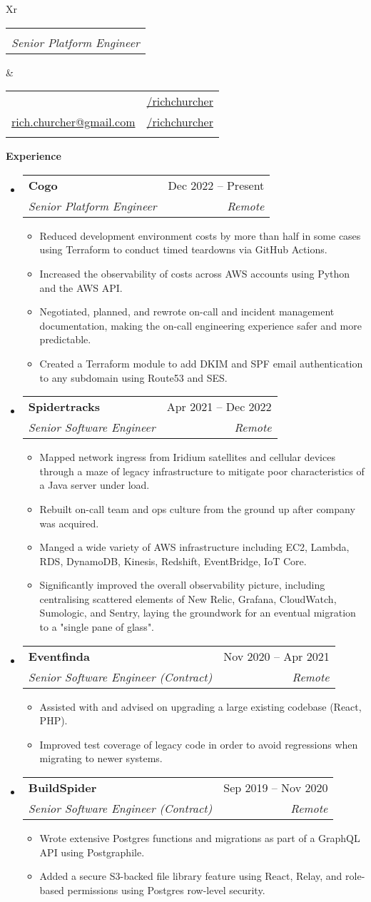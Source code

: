 \documentclass[12pt]{article}
\makeatletter
\def \fullname {Rich Churcher}
\def \subtitle {Senior Platform Engineer}
\def \linkedinicon {\faLinkedin}
\def \linkedinlink {https://linkedin.com/in/dwight-schrute/}
\def \linkedintext {/richchurcher}
\def \phoneicon {\faPhone}
\def \phonetext {+64-21-126-3919}
\def \emailicon {\faEnvelope}
\def \emaillink {mailto:rich.churcher@gmail.com}
\def \emailtext {rich.churcher@gmail.com}
\def \githubicon {\faGithub}
\def \githublink {https://github.com/richchurcher}
\def \githubtext {/richchurcher}
\def \headertype {\doublecol} %
\def \entryspacing {-0em}
\def \linkedin {\linkedinicon \hspace{1em}\href{\linkedinlink}{\linkedintext}}
\def \phone {\phoneicon \hspace{1em}{\phonetext}}
\def \email {\emailicon \hspace{1em}\href{\emaillink}{\emailtext}}
\def \github {\githubicon \hspace{1em}\href{\githublink}{\githubtext}}
\renewcommand{\section}[2]{\vspace{0.5ex}
  \colorbox{secondary}{\color{white}\raggedbottom\normalsize\textbf{{#1}{\hspace{0.5em}#2}}}
}
\newcommand{\resumeEntryStart}{\begin{itemize}[leftmargin=2.5mm]}
\newcommand{\resumeEntryEnd}{\end{itemize}\vspace{\entryspacing}}
\newcommand{\resumeItemListStart}{\begin{itemize}[leftmargin=4.5mm]}
\newcommand{\resumeItemListEnd}{\end{itemize}}
\newcommand{\resumeItem}[1]{
  \item\small{
    {#1 \vspace{-0.9ex}}
  }
}
\newcommand{\resumeEntryTSDL}[4]{
  \vspace{-0.5ex}\item[]
    \begin{tabularx}{0.97\textwidth}{X@{\hspace{5em}}r}
      \textbf{\color{primary}#1} & {\firabook\color{accent}\small#2} \\
      \textit{\color{accent}\small#3} & \textit{\color{accent}\small#4} \\
    \end{tabularx}\vspace{-0.9ex}
}
\newcommand{\doublecol}[6]{
  \begin{tabularx}{\textwidth}{Xr}
    {
      \begin{tabular}[c]{l}
        \fontsize{35}{45}\selectfont{\color{primary}{{\textbf{\fullname}}}} \\
          {\textit{\subtitle}}
      \end{tabular}\vspace{2ex}
    } & {
      \begin{tabular}[c]{l@{\hspace{1em}}l}
        {\small#4} & {\small#1} \\
        {\small#5} & {\small#2} \\
        {\small#6} & {\small#3}
      \end{tabular}
    }
  \end{tabularx}
}
\newcommand{\singlecol}[6]{
  \begin{tabularx}{\textwidth}{Xr}
    {
      \begin{tabular}[b]{l}
        \fontsize{35}{45}\selectfont{\color{primary}{{\textbf{\fullname}}}} \\
        {\textit{\subtitle}} %
      \end{tabular}
    } & {
      \begin{tabular}[c]{l}
        {\small#1} \\
        {\small#2} \\
        {\small#3} \\
        {\small#4} \\
        {\small#5} \\
        {\small#6}
      \end{tabular}
    }
  \end{tabularx}
}
\makeatother
\begin{document}
\headertype{\linkedin}{\github}{}{\phone}{\email}{}

\section{\faPieChart}{Experience}

  \resumeEntryStart
    \resumeEntryTSDL
      {Cogo}{Dec 2022 -- Present}
      {Senior Platform Engineer}{Remote}
    \resumeItemListStart
      \resumeItem {Reduced development environment costs by more than half in some cases using Terraform to conduct timed teardowns via GitHub Actions.}
      \resumeItem {Increased the observability of costs across AWS accounts using Python and the AWS API.}
      \resumeItem {Negotiated, planned, and rewrote on-call and incident management documentation, making the on-call engineering experience safer and more predictable.}
      \resumeItem {Created a Terraform module to add DKIM and SPF email authentication to any subdomain using Route53 and SES.}
    \resumeItemListEnd
  \resumeEntryEnd

  \resumeEntryStart
    \resumeEntryTSDL
      {Spidertracks}{Apr 2021 -- Dec 2022}
      {Senior Software Engineer}{Remote}
    \resumeItemListStart
      \resumeItem {Mapped network ingress from Iridium satellites and cellular devices through a maze of legacy infrastructure to mitigate poor characteristics of a Java server under load.}
      \resumeItem {Rebuilt on-call team and ops culture from the ground up after company was acquired.}
      \resumeItem {Manged a wide variety of AWS infrastructure including EC2, Lambda, RDS, DynamoDB, Kinesis, Redshift, EventBridge, IoT Core.}
      \resumeItem {Significantly improved the overall observability picture, including centralising scattered elements of New Relic, Grafana, CloudWatch, Sumologic, and Sentry, laying the groundwork for an eventual migration to a "single pane of glass".}
    \resumeItemListEnd
  \resumeEntryEnd

  \resumeEntryStart
    \resumeEntryTSDL
      {Eventfinda}{Nov 2020 -- Apr 2021}
      {Senior Software Engineer (Contract)}{Remote}
    \resumeItemListStart
        \resumeItem {Assisted with and advised on upgrading a large existing codebase (React, PHP).}
        \resumeItem {Improved test coverage of legacy code in order to avoid regressions when migrating to newer systems.}
    \resumeItemListEnd
  \resumeEntryEnd

  \resumeEntryStart
    \resumeEntryTSDL
      {BuildSpider}{Sep 2019 -- Nov 2020}
      {Senior Software Engineer (Contract)}{Remote}
    \resumeItemListStart
      \resumeItem {Wrote extensive Postgres functions and migrations as part of a GraphQL API using Postgraphile.}
      \resumeItem {Added a secure S3-backed file library feature using React, Relay, and role-based permissions using Postgres row-level security.}
    \resumeItemListEnd
  \resumeEntryEnd
\end{document}
